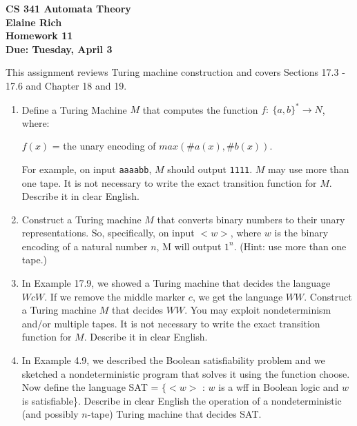 \documentclass[10pt]{article}
\begin{document}
\begin{center}
\textbf{
CS 341 Automata Theory \\
Elaine Rich \\
Homework 11 \\
Due: Tuesday, April 3}\\
\end{center}
\noindent
This assignment reviews Turing machine construction and covers Sections 17.3 - 17.6 and Chapter 18 and 19. \\

\begin{enumerate}[1)]


\item
Define a Turing Machine $M$ that computes the function $f:\ \{a, b\}^* \rightarrow N$, where:\\
\begin{center}
$f(x)$ = the unary encoding of $max(\#a(x), \#b(x))$.  
\end{center}
For example, on input \texttt{aaaabb}, $M$ should output \texttt{1111}.  $M$ may use more than one tape.  It is not necessary to 
write the exact transition function for $M$.  Describe it in clear English.


\item
Construct a Turing machine $M$ that converts binary numbers to their unary representations.  So, specifically, on 
input $<w>$, where $w$ is the binary encoding of a natural number $n$, M will output $1^n$.  (Hint: use more than one tape.)


\item
In Example 17.9, we showed a Turing machine that decides the language $WcW$.  If we remove the middle 
marker $c$, we get the language $WW$.  Construct a Turing machine $M$ that decides $WW$.  You may exploit 
nondeterminism and/or multiple tapes.  It is not necessary to write the exact transition function for $M$.  Describe 
it in clear English.



\item
In Example 4.9, we described the Boolean satisfiability problem and we sketched a nondeterministic program 
that solves it using the function choose.  Now define the language SAT = $\{<w>$ : $w$ is a wff in Boolean logic 
and $w$ is satisfiable\}.  Describe in clear English the operation of a nondeterministic (and possibly $n$-tape) Turing 
machine that decides SAT.



\end{enumerate}
\end{document}
